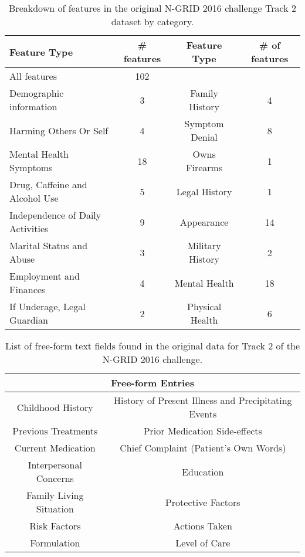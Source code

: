 
\begin{table}
{\small
    \centering
    \begin{tabular}{|l|c|c|c|}
    \hline
    \textsf{Feature Type} & \textsf{\# features} & \textsf{Feature Type} & \textsf{\# of features}  \\
    \hline
    \textsf{All features} &       102    & &   \\ 
    \hline
    \textsf{Demographic information} & 3 & \textsf{Family History} & 4 \\
    \textsf{Harming Others Or Self} & 4 & \textsf{Symptom Denial} & 8 \\
    \textsf{Mental Health Symptoms} & 18 & \textsf{Owns Firearms} & 1 \\ 
    \textsf{Drug, Caffeine and Alcohol Use} & 5 & \textsf{Legal History} & 1 \\
    \textsf{Independence of Daily Activities} & 9 & \textsf{Appearance} & 14 \\
    \textsf{Marital Status and Abuse} & 3 & \textsf{Military History} & 2 \\
    \textsf{Employment and Finances} & 4 & \textsf{Mental Health} & 18 \\
    \textsf{If Underage, Legal Guardian} & 2 & \textsf{Physical Health} & 6 \\
    \hline

    \end{tabular}
    \caption{Breakdown of features in the original N-GRID 2016 challenge Track 2 dataset by category.}
    \label{tab:data2}
}
\end{table}
  
\begin{table}
    {\small
    \centering
    \begin{tabular}{|c|c|}  
    \hline
    \multicolumn{2}{|c|}{\textsf{Free-form Entries}} \\
    \hline
    \textsf{Childhood History} & \textsf{History of Present Illness and Precipitating Events}  \\
    \textsf{Previous Treatments} & \textsf{Prior Medication Side-effects} \\
    \textsf{Current Medication} & \textsf{Chief Complaint (Patient's Own Words)}  \\ %
    \textsf{Interpersonal Concerns} & \textsf{Education}  \\
    \textsf{Family Living Situation} & \textsf{Protective Factors}  \\
    \textsf{Risk Factors} & \textsf{Actions Taken}  \\
    \textsf{Formulation} & \textsf{Level of Care} \\
    \hline
    \end{tabular}
    \caption{List of free-form text fields found in the original data for Track 2 of the N-GRID 2016 challenge.}
    \label{tab:textdata}
    }
\end{table}


